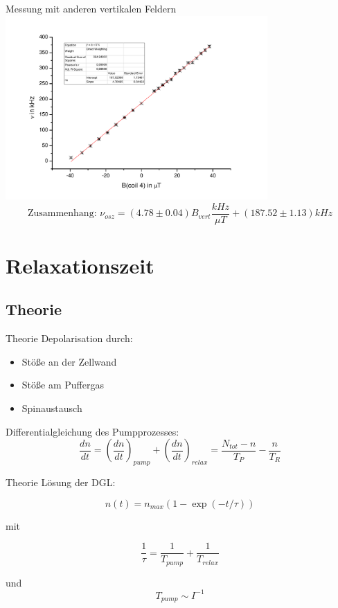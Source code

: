 \documentclass{beamer}
\begin{document}
\begin{frame}{Messung mit anderen vertikalen Feldern}
\centering \includegraphics[width=0.75\textwidth]{Bilder/Praezfeld.pdf}
$$\text{Zusammenhang: } \nu_{osz} = (4.78\pm0.04)B_{vert} \frac{kHz}{\mu T} + (187.52 \pm 1.13)kHz$$
\end{frame}

\section{Relaxationszeit}
\begin{frame}
\begin{center}
\end{center}
\end{frame}

\subsection{Theorie}
\begin{frame}{Theorie}
Depolarisation durch:
\begin{itemize}
\item Stöße an der Zellwand
\item Stöße am Puffergas
\item Spinaustausch
\end{itemize}

Differentialgleichung des Pumpprozesses:
 $$\frac{dn}{dt} = \left(\frac{dn}{dt}\right)_{pump} + \left(\frac{dn}{dt}\right)_{relax} = \frac{N_{tot}-n}{T_P} - \frac{n}{T_R}$$ %
\end{frame}

\begin{frame}{Theorie}
Lösung der DGL:

$$n(t) = n_{max}(1-\exp(-t/\tau))$$

mit

$$\frac{1}{\tau} = \frac{1}{T_{pump}} + \frac{1}{T_{relax}}$$ %

und $$T_{pump} \sim I^{-1}$$ %

\end{frame}
\end{document}
